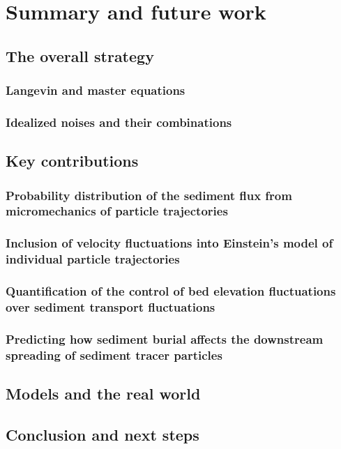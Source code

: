 
\chapter{Summary and future work}
\label{ch:conc}
\section{The overall strategy}
\subsection{Langevin and master equations}
\subsection{Idealized noises and their combinations}


\section{Key contributions}

\subsection{Probability distribution of the sediment flux from micromechanics of particle trajectories}

\subsection{Inclusion of velocity fluctuations into Einstein's model of individual particle trajectories}


\subsection{Quantification of the control of bed elevation fluctuations over sediment transport fluctuations}


\subsection{Predicting how sediment burial affects the downstream spreading of sediment tracer particles}


\section{Models and the real world}

\section{Conclusion and next steps}